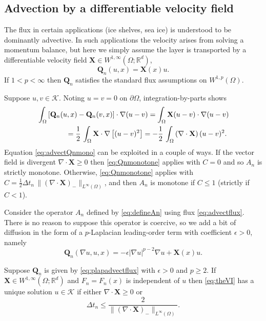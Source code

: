 \documentclass[final,onefignum]{siamart190516}
\newcommand\bQ{\mathbf{Q}}
\newcommand\bX{\mathbf{X}}
\newcommand{\Div}{\nabla\cdot}
\newcommand\eps{\epsilon}
\newcommand{\grad}{\nabla}
\newcommand\RR{\mathbb{R}}
\begin{document}
\subsection{Advection by a differentiable velocity field} \label{subsec:advect}  The flux in certain applications (ice shelves, sea ice) is understood to be dominantly advective.  In such applications the velocity arises from solving a momentum balance, but here we simply assume the layer is transported by a differentiable velocity field $\bX \in W^{1,\infty}(\Omega;\RR^d)$,
\begin{equation}
  \bQ_n(u,x) = \bX(x) u. \label{eq:advectflux}
\end{equation}
If $1<p<\infty$ then $\bQ_n$ satisfies the standard flux assumptions on $W^{1,p}(\Omega)$.

Suppose $u,v\in\mathcal{K}$.  Noting $u=v=0$ on $\partial \Omega$, integration-by-parts shows
\begin{align}
   &\int_\Omega \left[\bQ_n(u,x) - \bQ_n(v,x)\right] \cdot \grad (u - v) = \int_\Omega \bX (u-v) \cdot \grad (u - v)   \label{eq:advectQnmono} \\
   &\qquad\qquad = \frac{1}{2}\,\int_\Omega \bX \cdot \grad\left[ (u - v)^2 \right] = - \frac{1}{2}\,\int_\Omega \left(\Div\bX\right) (u - v)^2. \notag
\end{align}
Equation \eqref{eq:advectQnmono} can be exploited in a couple of ways.  If the vector field is divergent $\Div\bX\ge 0$ then \eqref{eq:Qnmonotone} applies with $C=0$ and so $A_n$ is strictly monotone.  Otherwise, \eqref{eq:Qnmonotone} applies with $C = \frac{1}{2}\Delta t_n\,\|(\Div\bX)_{-}\|_{L^\infty(\Omega)}$, and then $A_n$ is monotone if $C \le 1$ (strictly if $C < 1$).

Consider the operator $A_n$ defined by \eqref{eq:defineAn} using flux \eqref{eq:advectflux}.  There is no reason to suppose this operator is coercive, so we add a bit of diffusion in the form of a $p$-Laplacian leading-order term with coefficient $\eps>0$, namely
\begin{equation}
  \bQ_n(\grad u,u,x) = -\eps |\grad u|^{p-2} \grad u + \bX(x) u.   \label{eq:plapadvectflux}
\end{equation}

\begin{theorem}  \label{thm:plapadvectwellposed}  Suppose $\bQ_n$ is given by \eqref{eq:plapadvectflux} with $\eps>0$ and $p\ge 2$.  If $\bX \in W^{1,\infty}(\Omega;\RR^d)$ and $F_n=F_n(x)$ is independent of $u$ then \eqref{eq:theVI} has a unique solution $u\in\mathcal{K}$ if either $\Div \bX \ge 0$ or
\begin{equation}
  \Delta t_n \le \frac{2}{\|(\Div \bX)_-\|_{L^\infty(\Omega)}}. \label{eq:plapadvectdtcond}
\end{equation}
\end{theorem}
\end{document}
